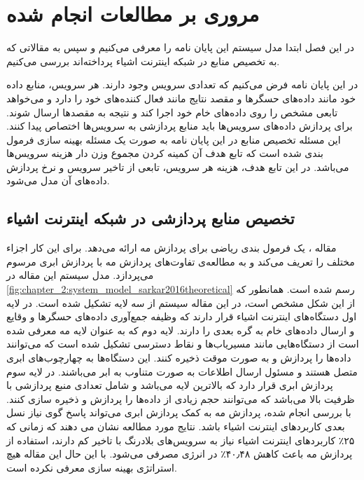 \chapter{مروری بر مطالعات انجام شده}\label{chap:literature_review}
  \thispagestyle{empty}
  در این فصل ابتدا مدل سیستم این پایان نامه را معرفی می‌کنیم و سپس به مقالاتی که به تخصیص منابع در شبکه اینترنت اشیاء پرداخته‌اند بررسی می‌کنیم.

  در این پایان نامه فرض می‌کنیم که تعدادی سرویس وجود دارند.
  هر سرویس، منابع داده خود مانند داده‌های حسگر‌ها و مقصد نتایج مانند فعال کننده‌های خود را دارد و می‌خواهد تابعی مشخص را روی  داده‌های خام خود اجرا کند و نتیجه به مقصد‌ها ارسال شوند.
  برای پردازش داده‌های سرویس‌ها باید منابع پردازشی به سرویس‌ها اختصاص پیدا کنند.
  این مسئله تخصیص منابع در این پایان نامه به صورت یک مسئله بهینه سازی فرمول بندی شده است که تابع هدف آن کمینه کردن مجموع وزن دار هزینه سرویس‌ها می‌باشد.
  در این تابع هدف، هزینه هر سرویس، تابعی از تاخیر سرویس و نرخ پردازش داده‌های آن مدل می‌شود.

  \section{تخصیص منابع پردازشی در شبکه اینترنت اشیاء}
    مقاله \cite{sarkar2016theoretical}، یک فرمول بندی ریاضی برای پردازش مه ارائه می‌دهد.
    برای این کار اجزاء مختلف را تعریف می‌کند و به مطالعه‌ی تفاوت‌های پردازش مه با پردازش ابری مرسوم می‌پردازد.
    مدل سیستم این مقاله در \cref{fig:chapter_2:system_model_sarkar2016theoretical} رسم شده است.
    همانطور که از این شکل مشخص است، در این مقاله سیستم از سه لایه تشکیل شده است.
    در لایه اول دستگاه‌های اینترنت اشیاء قرار دارند که وظیفه جمع‌آوری داده‌های حسگر‌ها و وقایع و ارسال داده‌های خام به گره بعدی را دارند.
    لایه دوم که به عنوان لایه مه معرفی شده است از دستگاه‌هایی مانند مسیریاب‌ها و نقاط دسترسی تشکیل شده است که می‌توانند داده‌ها را پردازش و به صورت موقت ذخیره کنند.
    این دستگاه‌ها به چهارچوب‌های ابری متصل هستند و مسئول ارسال اطلاعات به صورت متناوب به ابر می‌باشند.
    در لایه سوم پردازش ابری قرار دارد که بالاترین لایه می‌باشد و شامل تعدادی منبع پردازشی با ظرفیت بالا می‌باشد که می‌توانند حجم زیادی از داده‌‌ها را پردازش و ذخیره سازی کنند.
    با بررسی انجام شده، پردازش مه به کمک پردازش ابری می‌تواند پاسخ گوی نیاز نسل بعدی کاربرد‌های اینترنت اشیاء باشد.
    نتایج مورد مطالعه نشان می دهند که زمانی که ۲۵٪ کاربرد‌های اینترنت اشیاء نیاز به سرویس‌های بلادرنگ با تاخیر کم دارند، استفاده از پردازش مه باعث کاهش ۴۰٫۴۸٪ در انرژی مصرفی می‌شود.
    با این حال این مقاله هیچ استراتژی بهینه سازی معرفی نکرده است.


